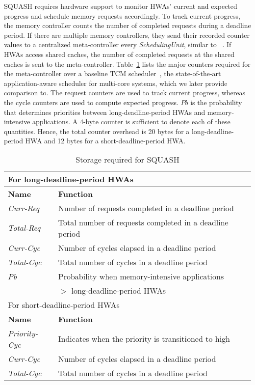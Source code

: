 \documentclass[10pt,letterpaper]{article}
\begin{document}
SQUASH requires hardware support to monitor HWAs' current and expected progress
and schedule memory requests accordingly. To track current progress, the memory
controller counts the number of completed requests during a deadline period. If
there are multiple memory controllers, they send their recorded counter values
to a centralized meta-controller every \emph{SchedulingUnit}, similar to
~\cite{atlas,tcm}. If HWAs access shared caches, the number of completed
requests at the shared caches is sent to the meta-controller.
Table~\ref{tab:storage} lists the major counters required for the
meta-controller over a baseline TCM scheduler~\cite{tcm}, the state-of-the-art
application-aware scheduler for multi-core systems, which we later
provide comparison to. The request counters are used to track current progress,
whereas the cycle counters are used to compute expected progress. $Pb$ is the
probability that determines priorities between long-deadline-period HWAs and
memory-intensive applications. A 4-byte counter is sufficient to denote each of
these quantities. Hence, the total counter overhead is 20 bytes for a
long-deadline-period HWA and 12 bytes for a short-deadline-period HWA.

\begin{table}[h!]
\vspace{-3mm}
\footnotesize
  \centering
  \begin{tabular}{|l|l|}
    \hline
    \multicolumn{2}{|l|}{For long-deadline-period HWAs} \\
    \hline
    \textbf{Name} & \textbf{Function} \\
    \hline
    {\it Curr-Req} & Number of requests completed in a
    deadline period\\
    \hline
    {\it Total-Req} & Total number of requests completed in a
    deadline period\\
    \hline
    {\it Curr-Cyc} & Number of cycles elapsed in a deadline period\\
    \hline
    {\it Total-Cyc} & Total number of cycles in a deadline period\\
    \hline
    {\it Pb} & Probability when memory-intensive applications \\
    & $>$ long-deadline-period HWAs \\
    \hline
    \hline
    \multicolumn{2}{|l|}{For short-deadline-period HWAs} \\
    \hline
    \textbf{Name} & \textbf{Function} \\
    \hline
    {\it Priority-Cyc} & Indicates when the priority is transitioned to high \\
    \hline
    {\it Curr-Cyc} & Number of cycles elapsed in a deadline period\\
    \hline
    {\it Total-Cyc} & Total number of cycles in a deadline period\\
    \hline
  \end{tabular}
\vspace{-2mm}
\caption{Storage required for SQUASH}
\label{tab:storage}
\vspace{-3mm}
\end{table}
\end{document}
